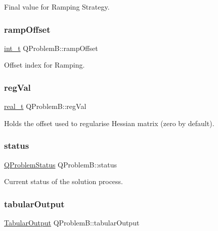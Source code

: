 Final value for Ramping Strategy. \mbox{\label{class_q_problem_b_a28453afb30a33fe30b59c592586d49c2}} 
\subsubsection{\texorpdfstring{ramp\+Offset}{rampOffset}}
{\footnotesize\ttfamily \hyperlink{_types_8hpp_ab6fd6105e64ed14a0c9281326f05e623}{int\+\_\+t} Q\+Problem\+B\+::ramp\+Offset\hspace{0.3cm}{\ttfamily [protected]}}

Offset index for Ramping. \mbox{\label{class_q_problem_b_af908e16b53b18ca061a7c1c894c17e8b}} 
\subsubsection{\texorpdfstring{reg\+Val}{regVal}}
{\footnotesize\ttfamily \hyperlink{qp_o_a_s_e_s__wrapper_8h_a0d00e2b3dfadee81331bbb39068570c4}{real\+\_\+t} Q\+Problem\+B\+::reg\+Val\hspace{0.3cm}{\ttfamily [protected]}}

Holds the offset used to regularise Hessian matrix (zero by default). \mbox{\label{class_q_problem_b_acc7ad0699dc78f9376ac5d5e84517b47}} 
\subsubsection{\texorpdfstring{status}{status}}
{\footnotesize\ttfamily \hyperlink{_types_8hpp_a8d5ce5a92124dc0106a5720f6d9a5abd}{Q\+Problem\+Status} Q\+Problem\+B\+::status\hspace{0.3cm}{\ttfamily [protected]}}

Current status of the solution process. \mbox{\label{class_q_problem_b_a81466d68cbeae767710b1d804a9b65cd}} 
\subsubsection{\texorpdfstring{tabular\+Output}{tabularOutput}}
{\footnotesize\ttfamily \hyperlink{struct_tabular_output}{Tabular\+Output} Q\+Problem\+B\+::tabular\+Output\hspace{0.3cm}{\ttfamily [protected]}}

